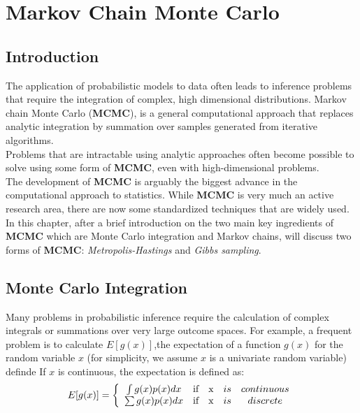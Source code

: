 \chapter*{Markov Chain Monte Carlo}
\section{Introduction}
The application of probabilistic models to data often leads to inference problems that require the integration of complex, high dimensional distributions. Markov chain Monte Carlo (\textbf{MCMC}), is a general computational approach that replaces analytic integration by summation over samples generated from iterative algorithms.\\
Problems that are intractable using analytic approaches often become possible to solve using some form of \textbf{MCMC}, even with high-dimensional problems. \\
The development of \textbf{MCMC} is arguably the biggest advance in the computational approach to statistics. While \textbf{MCMC} is very much an active research area, there are now some standardized techniques that are widely used. In this chapter, after a brief introduction on the two main key ingredients of \textbf{MCMC} which are Monte Carlo integration and Markov chains, will discuss two forms of \textbf{MCMC}: \textit{Metropolis-Hastings} and \textit{Gibbs sampling}. 
\section{Monte Carlo Integration}
Many problems in probabilistic inference require the calculation of complex integrals or
summations over very large outcome spaces. For example, a frequent problem is to calculate
$E[g(x)]$,the expectation of a function $g(x)$ for the random variable $x$ (for simplicity, we assume $x$ is a univariate random variable) definde
If $x$ is continuous, the expectation is defined as:
\begin{eqnarray} \label{eqn: Expectation}
E[g(x)] = \left\{
\begin{array}{ccccc}
\int g(x)p(x)dx  & \mbox{if} & $x$ & is & continuous \\
\sum g(x)p(x)dx  & \mbox{if} & $x$ & is & discrete
\end{array}
\right.
\end{eqnarray}

